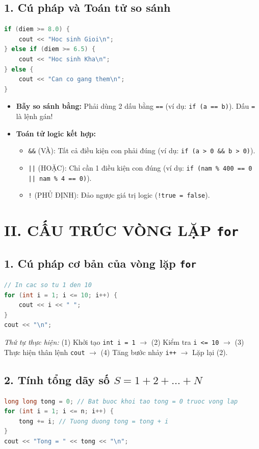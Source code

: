 \documentclass[11pt,a4paper]{article}
\begin{document}
\subsection*{\color{AsianBlue}1. Cú pháp và Toán tử so sánh}
\begin{lstlisting}[language=C++]
if (diem >= 8.0) {
    cout << "Hoc sinh Gioi\n";
} else if (diem >= 6.5) {
    cout << "Hoc sinh Kha\n";
} else {
    cout << "Can co gang them\n";
}
\end{lstlisting}

\begin{itemize}
    \setlength{\itemsep}{1.5pt}
    \small
    \item \textbf{Bẫy so sánh bằng:} Phải dùng 2 dấu bằng \texttt{==} (ví dụ: \texttt{if (a == b)}). Dấu \texttt{=} là lệnh gán!
    \item \textbf{Toán tử logic kết hợp:}
      \begin{itemize}
          \item \texttt{\&\&} (VÀ): Tất cả điều kiện con phải đúng (ví dụ: \texttt{if (a > 0 \&\& b > 0)}).
          \item \texttt{||} (HOẶC): Chỉ cần 1 điều kiện con đúng (ví dụ: \texttt{if (nam \% 400 == 0 || nam \% 4 == 0)}).
          \item \texttt{!} (PHỦ ĐỊNH): Đảo ngược giá trị logic (\texttt{!true = false}).
      \end{itemize}
\end{itemize}

\newpage
\section*{\color{AsianDarkBlue}II. CẤU TRÚC VÒNG LẶP \texttt{for}}

\subsection*{\color{AsianBlue}1. Cú pháp cơ bản của vòng lặp \texttt{for}}
\begin{lstlisting}[language=C++]
// In cac so tu 1 den 10
for (int i = 1; i <= 10; i++) {
    cout << i << " ";
}
cout << "\n";
\end{lstlisting}
\textit{Thứ tự thực hiện:} (1) Khởi tạo \texttt{int i = 1} $\rightarrow$ (2) Kiểm tra \texttt{i <= 10} $\rightarrow$ (3) Thực hiện thân lệnh \texttt{cout} $\rightarrow$ (4) Tăng bước nhảy \texttt{i++} $\rightarrow$ Lặp lại (2).

\subsection*{\color{AsianBlue}2. Tính tổng dãy số $S = 1 + 2 + \dots + N$}
\begin{lstlisting}[language=C++]
long long tong = 0; // Bat buoc khoi tao tong = 0 truoc vong lap
for (int i = 1; i <= n; i++) {
    tong += i; // Tuong duong tong = tong + i
}
cout << "Tong = " << tong << "\n";
\end{lstlisting}
\end{document}
